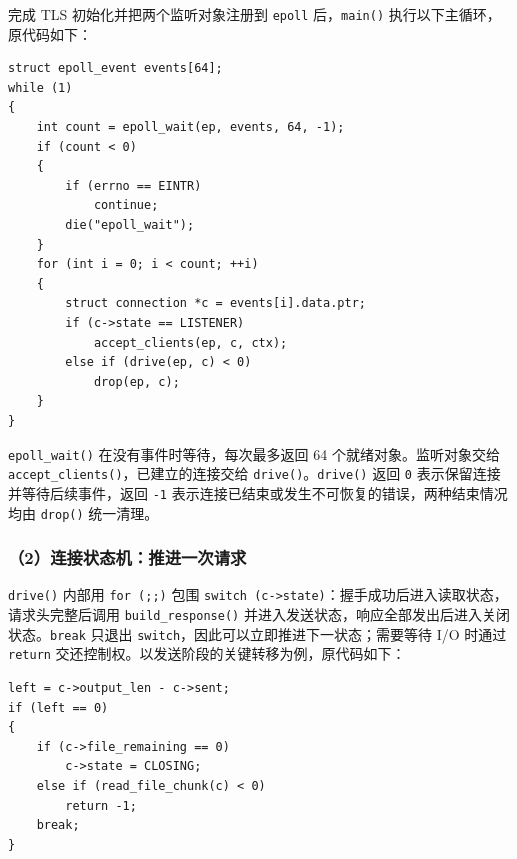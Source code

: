 \documentclass[UTF8,11pt,a4paper,fontset=fandol]{ctexart}
\begin{document}
完成 TLS 初始化并把两个监听对象注册到 \texttt{epoll} 后，\texttt{main(\allowbreak{})\allowbreak{}} 执行以下主循环，原代码如下：


\Needspace{210pt}
\noindent\begin{minipage}{\linewidth}
\begin{lstlisting}
struct epoll_event events[64];
while (1)
{
	int count = epoll_wait(ep, events, 64, -1);
	if (count < 0)
	{
		if (errno == EINTR)
			continue;
		die("epoll_wait");
	}
	for (int i = 0; i < count; ++i)
	{
		struct connection *c = events[i].data.ptr;
		if (c->state == LISTENER)
			accept_clients(ep, c, ctx);
		else if (drive(ep, c) < 0)
			drop(ep, c);
	}
}
\end{lstlisting}
\end{minipage}
\par

\texttt{epoll\_\allowbreak{}wait(\allowbreak{})\allowbreak{}} 在没有事件时等待，每次最多返回 64 个就绪对象。监听对象交给 \texttt{accept\_\allowbreak{}clients(\allowbreak{})\allowbreak{}}，已建立的连接交给 \texttt{drive(\allowbreak{})\allowbreak{}}。\texttt{drive(\allowbreak{})\allowbreak{}} 返回 \texttt{0} 表示保留连接并等待后续事件，返回 \texttt{-1} 表示连接已结束或发生不可恢复的错误，两种结束情况均由 \texttt{drop(\allowbreak{})\allowbreak{}} 统一清理。


\subsubsection*{（2）连接状态机：推进一次请求}

\texttt{drive(\allowbreak{})\allowbreak{}} 内部用 \texttt{for (\allowbreak{};;)\allowbreak{}} 包围 \texttt{switch (\allowbreak{}c->state)\allowbreak{}}：握手成功后进入读取状态，请求头完整后调用 \texttt{build\_\allowbreak{}response(\allowbreak{})\allowbreak{}} 并进入发送状态，响应全部发出后进入关闭状态。\texttt{break} 只退出 \texttt{switch}，因此可以立即推进下一状态；需要等待 I/O 时通过 \texttt{return} 交还控制权。以发送阶段的关键转移为例，原代码如下：


\Needspace{110pt}
\noindent\begin{minipage}{\linewidth}
\begin{lstlisting}
left = c->output_len - c->sent;
if (left == 0)
{
	if (c->file_remaining == 0)
		c->state = CLOSING;
	else if (read_file_chunk(c) < 0)
		return -1;
	break;
}
\end{lstlisting}
\end{minipage}
\par
\end{document}
